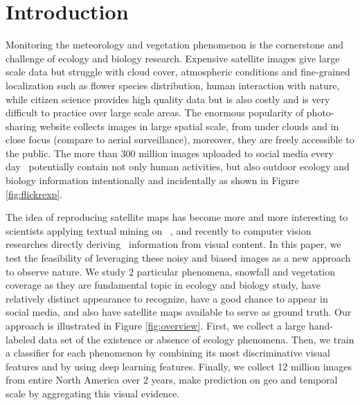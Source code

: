 \section{Introduction}

Monitoring the meteorology and vegetation phenomenon is the cornerstone and challenge of ecology and biology research. Expensive satellite images give large scale data but struggle with cloud cover, 
atmospheric conditions and fine-grained localization such as flower species distribution, human interaction with nature,
while citizen science provides high quality data but is also costly and is very difficult to practice over large scale areas.
The enormous popularity of photo-sharing website collects images in large spatial scale, from under clouds and in close focus (compare to aerial surveillance), 
moreover, they are freely accessible to the public.
The more than 300 million images uploaded to social media every day~\cite{facebookstatistics}
 potentially contain not only human activities, but also outdoor ecology and biology information intentionally and incidentally as shown in Figure \ref{fig:flickrexp}.

The idea of reproducing satellite maps has become more and more interesting to scientists applying textual mining on~\cite{bollen11twitter,ecology2012www,you2015multifacetedelections,wood2013usingtourism} , 
and recently to computer vision researches directly deriving~\cite{murdock}  information from visual content.
In this paper, we test the feasibility of leveraging these noisy and biased images as a new approach to observe nature. We study 2 particular phenomena, snowfall and vegetation coverage as they are fundamental topic in ecology and biology study, have relatively distinct appearance to recognize, have a good chance to appear in social media, and also have satellite maps available to serve as ground truth. Our approach is illustrated in Figure \ref{fig:overview}. 
First, we collect a large hand-labeled data set of the existence or absence of ecology phenomena. 
Then, we train a classifier for each phenomenon by combining its most discriminative visual features and by using deep learning features. 
Finally, we collect 12 million images from entire North America over 2 years, make prediction on geo and temporal scale by aggregating this visual evidence.

